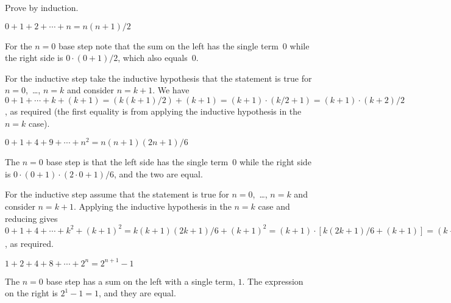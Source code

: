 \documentclass{test}  %
\begin{document}
\begin{problem}
Prove by induction.
\begin{exes}
\begin{exercise}
  $0+1+2+\cdots+n=n(n+1)/2$
\end{exercise}
\begin{answer}
  For the $n=0$ base step note that the sum on the left
  has the single term~$0$
  while the right side is $0\cdot(0+1)/2$, which also equals~$0$.

  For the inductive step take the inductive hypothesis 
  that the statement is true for $n=0$,~\ldots, $n=k$ and consider $n=k+1$.
  We have 
  $0+1+\cdots+k+(k+1)=(k(k+1)/2)+(k+1)=(k+1)\cdot(k/2+1)=(k+1)\cdot(k+2)/2$, 
  as required  
  (the first equality is from applying the inductive hypothesis in 
  the $n=k$ case).
\end{answer} 
\begin{exercise}
  $0+1+4+9+\cdots+n^2=n(n+1)(2n+1)/6$
\end{exercise}
\begin{answer} 
  The $n=0$ base step is that the left side has the single term~$0$
  while the right side is $0\cdot(0+1)\cdot(2\cdot 0+1)/6$, and the 
  two are equal.

  For the inductive step assume that the statement is true for 
  $n=0$,~\ldots, $n=k$ and consider $n=k+1$.
  Applying the inductive hypothesis in the $n=k$ case and reducing gives
  $0+1+4+\cdots+k^2+(k+1)^2=k(k+1)(2k+1)/6+(k+1)^2
    =(k+1)\cdot [k(2k+1)/6+(k+1)]
    =(k+1)\cdot [k(2k+1)+6(k+1)]/6
    =(k+1)\cdot [2k^2+7k+6]/6
    =(k+1)(k+2)(2(k+1)+1)/6$,
  as required.
\end{answer}

\begin{exercise}
  $1+2+4+8+\cdots+2^n=2^{n+1}-1$
\end{exercise}
\begin{answer} 
The $n=0$ base step has a sum on the left with a single term, $1$.
The expression on the right is $2^1-1=1$, and they are equal.


\end{answer}
\end{exes}
\end{problem}
\end{document}
